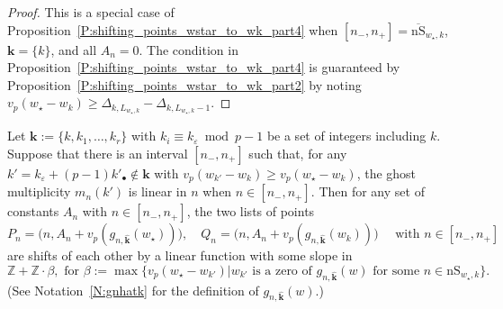 \begin{proof}
    This is a special case of Proposition~\ref{P:shifting_points_wstar_to_wk_part4} when $[n_-, n_+] = \overline{\mathrm{nS}}_{w_\star,k}$, ${\mathbf{k}}= \{k\}$, and all $A_n =0$. The condition in Proposition~\ref{P:shifting_points_wstar_to_wk_part4} is guaranteed by Proposition~\ref{P:shifting_points_wstar_to_wk_part2} by noting $v_p(w_\star-w_k) \geq  \Delta_{k, L_{ w_\star, k}} - \Delta_{k, L_{ w_\star, k}-1}$.
\end{proof}

\begin{proposition}
    \label{P:shifting_points_wstar_to_wk_part4}
    Let ${\mathbf{k}}:=\{k, k_1, \dots, k_r\}$ with $k_i \equiv k_\varepsilon \bmod p-1$ be a set of integers including $k$.
    Suppose that there is an interval $[n_-,n_+]$ such that, for any $k' = k_\varepsilon + (p-1)k'_\bullet \notin {\mathbf{k}}$ with $v_p(w_{k'}-w_k) \geq v_p(w_\star - w_k)$, the ghost multiplicity $m_n(k')$ is linear in $n$ when $n \in [n_-,n_+]$.
    Then for any set of constants $A_n$ with $n \in [n_-,n_+]$, the two lists of points
    $$
    P_n = \big(n, A_n+v_p(g_{n,\hat {{\mathbf{k}}}}(w_\star))\big), \quad Q_n = \big(n, A_n+v_p(g_{n,\hat {{\mathbf{k}}}}(w_k))\big)  \quad \textrm{ with }n \in [ n_-,n_+]
    $$
    are shifts of each other by a linear function with some slope in
    \begin{equation}
    \label{E:possible_shift_slopes_general_case}
    {\mathbb{Z}}+ {\mathbb{Z}}\cdot\beta, \text{~for~} \beta:= \max \{ v_p(w_\star - w_{k'})| w_{k'} \text{~is a zero of~} g_{n,\hat{{\mathbf{k}}}}(w) \text{~for some~} n\in {\mathrm{nS}}_{w_\star,k} \}.
    \end{equation}
    (See Notation~\ref{N:gnhatk} for the definition of $g_{n,\hat {{\mathbf{k}}}}(w)$.)
\end{proposition}

